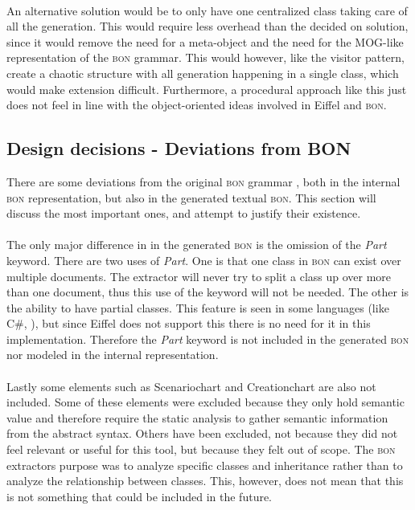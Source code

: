 \paragraph{}
An alternative solution would be to only have one centralized class taking care of all the generation. This would require less overhead than the decided on solution, since it would remove the need for a meta-object and the need for the MOG-like representation of the \textsc{bon} grammar. This would however, like the visitor pattern, create a chaotic structure with all generation happening in a single class, which would make extension difficult. Furthermore, a procedural approach like this just does not feel in line with the object-oriented ideas involved in Eiffel and \textsc{bon}.

\subsection{Design decisions - Deviations from BON}
\label{deviations_from_bon}There are some deviations from the original \textsc{bon} grammar \cite[pp.~352-359]{walden1995}, both in the internal \textsc{bon} representation, but also in the generated textual \textsc{bon}. This section will discuss the most important ones, and attempt to justify their existence. 

\paragraph{}
The only major difference in in the generated \textsc{bon} is the omission of the \textit{Part} keyword. There are two uses of \textit{Part}. One is that one class in \textsc{bon} can exist over multiple documents. The extractor will never try to split a class up over more than one document, thus this use of  the keyword will not be needed. The other is the ability to have partial classes. This feature is seen in some languages (like C\#, \cite{msdn2009}), but since Eiffel does not support this there is no need for it in this implementation. Therefore the \textit{Part} keyword is not included in the generated \textsc{bon} nor modeled in the internal representation.

\paragraph{}
Lastly some elements such as Scenario\textunderscore chart and Creation\textunderscore chart are also not included. Some of these elements were excluded because they only hold semantic value and therefore require the static analysis to gather semantic information from the abstract syntax. Others have been excluded, not because they did not feel relevant or useful for this tool, but because they felt out of scope. The \textsc{bon} extractors purpose was to analyze specific classes and inheritance rather than to analyze the relationship between classes. This, however, does not mean that this is not something that could be included in the future.

